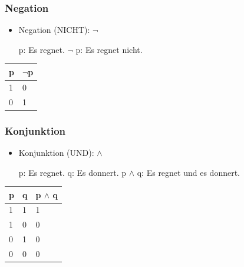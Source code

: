 \begin{frame}
\frametitle{Negation}

\begin{itemize}
	\item Negation (NICHT): $\lnot$
	
	\eal
		\ex p: Es regnet.
		\ex $\lnot$ p: Es regnet nicht.
	\zl
	
\end{itemize}

\begin{table}
\centering
\begin{tabular}{p{3cm}|p{3cm}}
\textbf{p} & \textbf{$\lnot$p}\\
\hline
1 & 0\\
\hline
0 & 1\\
\end{tabular}
\end{table}

\end{frame}



\begin{frame}
\frametitle{Konjunktion}

\begin{itemize}
	\item Konjunktion (UND): $\land$
	
	\eal
		\ex p: Es regnet.
		\ex q: Es donnert.
		\ex p $\land$ q: Es regnet und es donnert.
	\zl

\end{itemize}
	

\begin{table}
\centering

\begin{tabular}{p{2cm}|p{2cm}|p{2cm}}
\textbf{p} & \textbf{q} & \textbf{p} $\land$ \textbf{q}\\
\hline
1 & 1 & 1\\
\hline
1 & 0 & 0\\
\hline
0 & 1 & 0\\
\hline 
0 & 0 & 0\\
\end{tabular}

\end{table}	

\end{frame}



